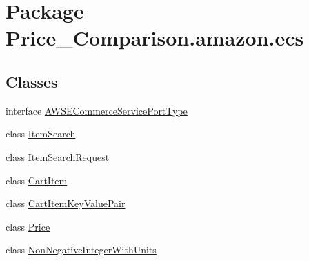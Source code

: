 \hypertarget{namespace_price___comparison_1_1amazon_1_1ecs}{\section{Package Price\-\_\-\-Comparison.\-amazon.\-ecs}
\label{namespace_price___comparison_1_1amazon_1_1ecs}
}
\subsection*{Classes}
\begin{DoxyCompactItemize}
\item 
interface \hyperlink{interface_price___comparison_1_1amazon_1_1ecs_1_1_a_w_s_e_commerce_service_port_type}{A\-W\-S\-E\-Commerce\-Service\-Port\-Type}
\item 
class \hyperlink{class_price___comparison_1_1amazon_1_1ecs_1_1_item_search}{Item\-Search}
\begin{DoxyCompactList}\small\item\em \end{DoxyCompactList}\item 
class \hyperlink{class_price___comparison_1_1amazon_1_1ecs_1_1_item_search_request}{Item\-Search\-Request}
\begin{DoxyCompactList}\small\item\em \end{DoxyCompactList}\item 
class \hyperlink{class_price___comparison_1_1amazon_1_1ecs_1_1_cart_item}{Cart\-Item}
\begin{DoxyCompactList}\small\item\em \end{DoxyCompactList}\item 
class \hyperlink{class_price___comparison_1_1amazon_1_1ecs_1_1_cart_item_key_value_pair}{Cart\-Item\-Key\-Value\-Pair}
\begin{DoxyCompactList}\small\item\em \end{DoxyCompactList}\item 
class \hyperlink{class_price___comparison_1_1amazon_1_1ecs_1_1_price}{Price}
\begin{DoxyCompactList}\small\item\em \end{DoxyCompactList}\item 
class \hyperlink{class_price___comparison_1_1amazon_1_1ecs_1_1_non_negative_integer_with_units}{Non\-Negative\-Integer\-With\-Units}

\end{DoxyCompactItemize}
